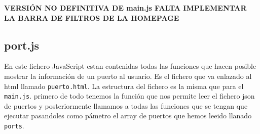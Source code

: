 \documentclass{article}
\begin{document}
\begin{itemize}
    \textbf{VERSIÓN NO DEFINITIVA DE main.js FALTA IMPLEMENTAR LA BARRA DE FILTROS DE LA HOMEPAGE}
\end{itemize}

\subsection{port.js}
En este fichero JavaScript estan contenidas todas las funciones que hacen posible mostrar la información de un puerto al usuario. Es el fichero que va enlazado al html llamado \texttt{puerto.html}. La estructura del fichero es la misma que para el \texttt{main.js}. primero de todo tenemos la función que nos permite leer el fichero json de puertos y posteriormente llamamos a todas las funciones que se tengan que ejecutar pasandoles como pámetro el array de puertos que hemos leeido llanado \texttt{ports}.
\end{document}
